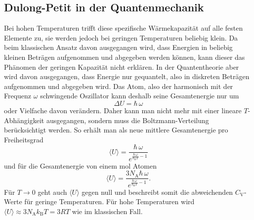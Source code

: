 \subsection{Dulong-Petit in der Quantenmechanik}
Bei hohen Temperaturen trifft diese spezifische Wärmekapazität auf alle festen Elemente zu, sie werden jedoch bei geringen Temperaturen beliebig klein. Da beim klassischen Ansatz davon ausgegangen wird, dass Energien in beliebig kleinen Beträgen aufgenommen und abgegeben werden können, kann dieser das Phänomen der geringen Kapazität nicht erklären.\newline
In der Quantentheorie aber wird davon ausgegangen, dass Energie nur gequantelt, also in diskreten Beträgen aufgenommen und abgegeben wird. \newline Das Atom, also der harmonisch mit der Frequenz $\omega$ schwingende Oszillator kann deshalb seine Gesamtenergie nur um 
\begin{equation}
\Delta U=\hbar\,\omega \label{eq:deltaU}
\end{equation}
oder Vielfache davon verändern.
Daher kann man nicht mehr mit einer lineare $T$-Abhängigkeit ausgegangen, sondern muss die Boltzmann-Verteilung berücksichtigt werden.\newline
So erhält man als neue mittlere Gesamtenergie pro Freiheitsgrad \cite{V201}
\begin{equation*}
\langle U \rangle = \frac{\hbar\,\omega}{e^{\frac{\hbar\,\omega}{k_\text{B}T}-1}}
\end{equation*}
und für die Gesamtenergie von einem $\si{\mol}$ Atomen
\begin{equation}
\langle U \rangle = \frac{3N_\text{A}\hbar\,\omega}{e^{\frac{\hbar\,\omega}{k_\text{B}T}-1}}. \label{eq:U4}
\end{equation}
Für $T\rightarrow0$ geht auch $\langle U \rangle$ gegen null und beschreibt somit die abweichenden $C_\text{V}$-Werte für geringe Temperaturen.
Für hohe Temperaturen wird $\langle U \rangle \approx 3N_\text{A}k_\text{B}T= 3RT$ wie im klassischen Fall.
